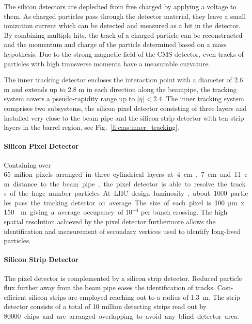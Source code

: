 The silicon detectors are depledted from free charged by applying a voltage to
them. As charged particles pass through the detector material, they leave a
small ionization current which can be detected and measured as a hit in the
detector. By combining multiple hits, the track of a charged particle can be
reconstructed and the momentum and charge of the particle determined based on a
mass hypothesis. Due to the strong magnetic field of the CMS detector, even
tracks of particles with high transverse momenta have a measurable curvature.
 
The inner tracking detector encloses the interaction point with a diameter of 2.6 m and
extends up to 2.8 m in each direction along the beampipe, the tracking system covers a
pseudo-rapidity range up to $|\eta| < 2.4$. The inner tracking system comprises
two subsystems, the silicon pixel detector consisting of three layers and
installed very close to the beam pipe and the silicon strip detector with ten
strip layers in the barrel region, see Fig.~\ref{fi:cms:inner_tracking}. 

\paragraph{Silicon Pixel Detector} Containing over \SI{65} milion pixels
arranged in three cylindrical layers at \SI{4}{\centi\meter},
\SI{7}{\centi\meter} and \SI{11}{\centi\meter} distance to the beam pipe, the
pixel detector is able to resolve the tracks of the huge number particles. At
LHC design luminosity, about 1000 particles pass the tracking detector on
average. The size of each pixel is \SI{100}{\micro \meter} x \SI{150}{\micro
\meter} giving a average occupancy of $10^{-4}$ per bunch crossing.  The high
spatial resolution achieved by the pixel detector furthermore allows the
identification and measurement of secondary vertices used to identify long-lived
particles.

\paragraph{Silicon Strip Detector} The pixel detector is complemented by a silicon
strip detector. Reduced particle flux further away from the beam pipe eases the identification
of tracks. Cost-efficient silicon strips are employed reaching out to
a radius of \SI{1.3}{\meter}. The strip detector consists of a total of 10 million
detecting strips read out by \SI{80000} chips and are arranged overlapping to
avoid any blind detector area.

